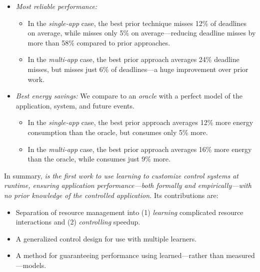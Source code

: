 \begin{itemize}[leftmargin=1em]
\item \textit{Most reliable performance:}
  \begin{itemize}[leftmargin=1em]
  \item In the \emph{single-app} case, the best prior technique misses
    12\% of deadlines on average, while \SYSTEM{} misses only 5\% on
    average---reducing deadline misses by more than 58\% compared to
    prior approaches.
  \item In the \emph{multi-app} case, the best prior approach averages
    24\% deadline misses, but \SYSTEM{} misses just 6\% of
    deadlines---a huge improvement over prior work.
  \end{itemize}
\item \textit{Best energy savings:} We compare to an \emph{oracle}
  with a perfect model of the application, system, and future events.
  \begin{itemize}[leftmargin=1em]
  \item In the \emph{single-app} case, the best prior approach
    averages 12\% more energy consumption than the oracle, but
    \SYSTEM{} consumes only 5\% more.
  \item In the \emph{multi-app} case, the best prior approach averages
    16\% more energy than the oracle, while \SYSTEM{} consumes just
    9\% more.
  \end{itemize}
\end{itemize}

In summary, \emph{\SYSTEM{} is the first work to use learning to
  customize control systems at runtime, ensuring application
  performance---both formally and empirically---with no prior
  knowledge of the controlled application.}  Its contributions are:
\begin{itemize}[leftmargin=1em]
\item Separation of resource management into (1) \emph{learning}
  complicated resource interactions and (2) \emph{controlling}
  speedup.
\item A generalized control design for use with multiple learners.
\item A method for guaranteeing performance using learned---rather
  than measured---models.
\end{itemize}



